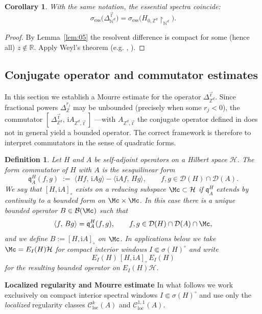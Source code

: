 \documentclass[10pt]{amsart}
\newcommand{\R}{{\mathbb{R}}}
\newcommand{\Z}{{\mathbb{Z}}}
\newcommand{\N}{{\mathbb{N}}}
\newcommand{\1}{{\mathbb{I}}}
\newcommand{\Bc}{\mathcal{B}}
\newcommand{\Dc}{\mathcal{D}}
\newcommand{\Hc}{\mathcal{H}}
\numberwithin{equation}{section}
\newtheorem{definition}[theorem]{Definition}%
\newtheorem{corollary}[theorem]{Corollary}%
\begin{document}
\begin{corollary}\label{cor:ess-spectrum}
With the same notation, the essential spectra coincide:
\[
\sigma_{\mathrm{ess}}\!\big(\Delta^{\vec{\mathrm{r}}}_{\N^d}\big)
= \sigma_{\mathrm{ess}}\!\big(H_{0,\Z^d}\!\restriction_{\N^d}\big).
\]
\end{corollary}

\begin{proof}
By Lemma~\ref{lem:05} the resolvent difference is compact for some (hence all) $z\notin\R$. Apply Weyl's theorem (e.g. \cite[Theorem.~XIII.14]{RS}, \cite[Proposition.~4.5.3]{ABG}).
\end{proof}

\subsection{Conjugate operator and commutator estimates}

In this section we establish a Mourre estimate for the operator
\(\Delta_{\Z^d}^{\vec{\mathrm{r}}}\).
Since fractional powers \(\Delta^{r_j}_{\Z}\) may be unbounded
(precisely when some \(r_j<0\)), the commutator
\([\,\Delta_{\Z^d}^{\vec{\mathrm{r}}},\,\mathrm i A_{\Z^d,\vec{\mathrm{r}}}\,]\) ---with
\(A_{\Z^d,\vec{\mathrm{r}}}\) the conjugate operator defined in \cite{At}
does not in general yield a bounded operator.
The correct framework is therefore to interpret commutators
in the sense of quadratic forms.



\begin{definition}\label{def:form-commutator}
Let $H$ and $A$ be self-adjoint operators on a Hilbert space $\Hc$.
The \emph{form commutator} of $H$ with $A$ is the sesquilinear form
\[
\mathfrak q_A^H(f,g) \;:=\;
\langle Hf,\,\mathrm iAg\rangle - \langle \mathrm iAf,\,Hg\rangle,
\qquad f,g\in\Dc(H)\cap\Dc(A).
\]
We say that $[H,\mathrm i A]_\circ$ exists on a reducing subspace
$\Mc\subset\Hc$ if $\mathfrak q_A^H$ extends by continuity to a bounded form
on $\Mc\times\Mc$. In this case there is a unique bounded operator
$B\in\Bc(\Mc)$ such that
\[
\langle f,\,Bg\rangle = \mathfrak q_A^H(f,g),
\qquad f,g\in\Dc(H)\cap\Dc(A)\cap\Mc,
\]
and we define $B:=[H,\mathrm iA]_\circ$ on $\Mc$.
In applications below we take $\Mc=E_I(H)\Hc$ for compact interior windows
\(I\Subset\sigma(H)^\circ\) and write
\[
E_I(H)\,[H,\mathrm i A]_\circ\,E_I(H)
\]
for the resulting bounded operator on $E_I(H)\Hc$.
\end{definition}

\textbf{Localized regularity and Mourre estimate}\label{subsec:loc-classes}
In what follows we work exclusively on compact interior spectral windows
\(I\Subset\sigma(H)^\circ\) and use only the \emph{localized} regularity classes
\(\mathcal C^k_{\mathrm{loc}}(A)\) and \(\mathcal C^{1,1}_{\mathrm{loc}}(A)\).
\end{document}
